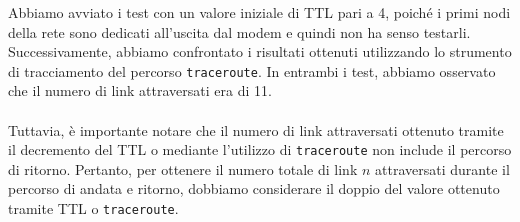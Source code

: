 Abbiamo avviato i test con un valore iniziale di TTL pari a 4, poiché i primi nodi della rete sono dedicati all'uscita dal modem e quindi non ha senso testarli. Successivamente, abbiamo confrontato i risultati ottenuti utilizzando lo strumento di tracciamento del percorso \texttt{traceroute}. In entrambi i test, abbiamo osservato che il numero di link attraversati era di 11.\\\\
Tuttavia, è importante notare che il numero di link attraversati ottenuto tramite il decremento del TTL o mediante l'utilizzo di \texttt{traceroute} non include il percorso di ritorno. Pertanto, per ottenere il numero totale di link $n$ attraversati durante il percorso di andata e ritorno, dobbiamo considerare il doppio del valore ottenuto tramite TTL o \texttt{traceroute}.